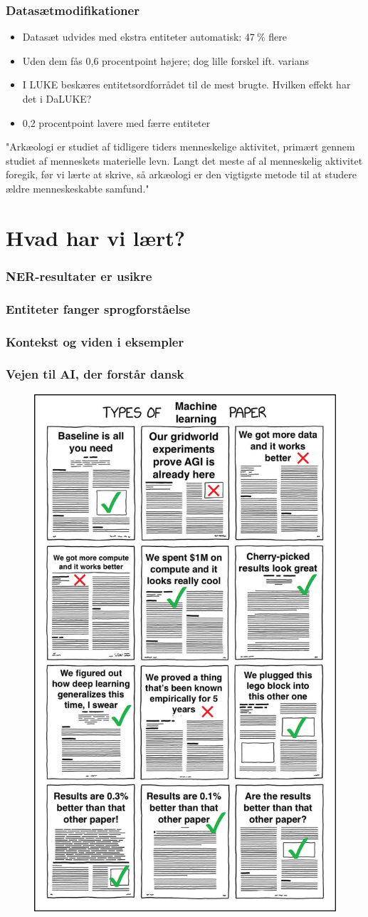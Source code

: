 \documentclass{beamer}
\newcommand{\unit}[1]{\ensuremath{\:\text{#1}}}
\newcommand{\pro}{\ensuremath{\unit{\%{}}}}
\begin{document}
\begin{frame}
    \frametitle{Datasætmodifikationer}
    \begin{itemize}
        \item Datasæt udvides med ekstra entiteter automatisk: $ 47\pro $ flere
        \item Uden dem fås 0,6 procentpoint højere; dog lille forskel ift. varians
        \item I LUKE beskæres entitetsordforrådet til de mest brugte. Hvilken effekt har det i DaLUKE?
        \item 0,2 procentpoint lavere med færre entiteter
    \end{itemize}
    \begin{example}
        "Arkæologi er studiet af tidligere tiders {\color{red}menneske}lige {\color{red}aktivitet}, primært gennem studiet af {menneske}ts materielle levn. Langt det meste af al {menneske}lig {\color{red}aktivitet} foregik, før vi lærte at skrive, så {arkæologi} er den vigtigste metode til at studere ældre {menneske}skabte samfund."
    \end{example}
\end{frame}

\section{Hvad har vi lært?}


\begin{frame}
    \frametitle{NER-resultater er usikre}
    
\end{frame}

\begin{frame}
    \frametitle{Entiteter fanger sprogforståelse}
\end{frame}

\begin{frame}
    \frametitle{Kontekst og viden i eksempler}
\end{frame}

\begin{frame}
    \frametitle{Vejen til AI, der forstår dansk}
\end{frame}

\begin{frame}
    \begin{figure}[H]
        \centering
        \includegraphics[width=.4\textwidth]{types-of-ml}
    \end{figure}\noindent
\end{frame}
\end{document}
